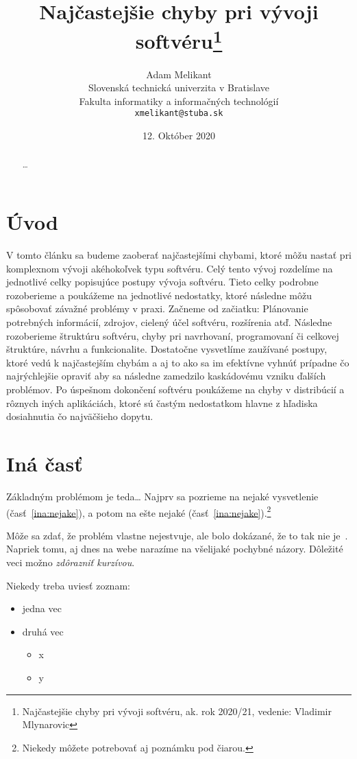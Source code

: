 \documentclass[10pt,twoside,slovak,a4paper]{article}
\title{Najčastejšie chyby pri vývoji softvéru\thanks{Najčastejšie chyby pri vývoji softvéru, ak. rok 2020/21, vedenie: Vladimir Mlynarovic}} %
\author{Adam Melikant\\[2pt]
	{\small Slovenská technická univerzita v Bratislave}\\
	{\small Fakulta informatiky a informačných technológií}\\
	{\small \texttt{xmelikant@stuba.sk}}
	}
\date{\small 12. Október 2020} %
\begin{document}
\maketitle

\begin{abstract}
\ldots
\end{abstract}



\section{Úvod}

V tomto článku sa budeme zaoberať najčastejšími chybami, ktoré môžu nastať pri komplexnom vývoji akéhokoľvek typu softvéru. Celý tento vývoj rozdelíme na jednotlivé celky popisujúce postupy vývoja softvéru. Tieto celky podrobne rozoberieme a poukážeme na jednotlivé nedostatky, ktoré následne môžu spôsobovať závažné problémy v praxi. Začneme od začiatku: Plánovanie potrebných informácií, zdrojov, cielený účel softvéru, rozšírenia atď. Následne rozoberieme štruktúru softvéru, chyby pri navrhovaní, programovaní či celkovej štruktúre, návrhu a funkcionalite. Dostatočne vysvetlíme zaužívané postupy, ktoré vedú k najčastejším chybám a aj to ako sa im efektívne vyhnúť prípadne čo najrýchlejšie opraviť aby sa následne zamedzilo kaskádovému vzniku ďalších problémov. Po úspešnom dokončení softvéru poukážeme na chyby v distribúcií a rôznych iných aplikáciách, ktoré sú častým nedostatkom hlavne z hľadiska dosiahnutia čo najväčšieho dopytu.



\section{Iná časť} \label{ina}

Základným problémom je teda\ldots{} Najprv sa pozrieme na nejaké vysvetlenie (časť~\ref{ina:nejake}), a potom na ešte nejaké (časť~\ref{ina:nejake}).\footnote{Niekedy môžete potrebovať aj poznámku pod čiarou.}

Môže sa zdať, že problém vlastne nejestvuje\cite{Coplien:MPD}, ale bolo dokázané, že to tak nie je~\cite{Czarnecki:Staged, Czarnecki:Progress}. Napriek tomu, aj dnes na webe narazíme na všelijaké pochybné názory\cite{PLP-Framework}. Dôležité veci možno \emph{zdôrazniť kurzívou}.


Niekedy treba uviesť zoznam:

\begin{itemize}
\item jedna vec
\item druhá vec
	\begin{itemize}
	\item x
	\item y
	\end{itemize}
\end{itemize}
\end{document}
